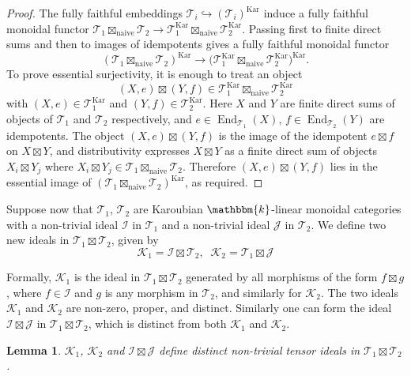 \documentclass[11pt,a4paper]{amsart}
\theoremstyle{plain}%
\newtheorem{lemma}{Lemma}[subsection]
\theoremstyle{definition}
\theoremstyle{remark}
\newcommand{\End}{\operatorname{End}}
\newcommand{\kk}{\mathbbm{k}}
\newcommand{\Kar}{\mathrm{Kar}}
\begin{document}
\begin{proof}
The fully faithful embeddings $\mathcal{T}_i\hookrightarrow (\mathcal{T}_i)^{\Kar}$ induce a fully faithful monoidal functor $\mathcal{T}_1\boxtimes_{\mathrm{naive}}\mathcal{T}_2 \to \mathcal{T}_1^{\Kar}\boxtimes_{\mathrm{naive}} \mathcal{T}_2^{\Kar}$. Passing first to finite direct sums and then to images of idempotents gives a fully faithful monoidal functor
\[ (\mathcal{T}_1\boxtimes_{\mathrm{naive}}\mathcal{T}_2)^{\Kar} \longrightarrow
\bigl(\mathcal{T}_1^{\Kar}\boxtimes_{\mathrm{naive}}\mathcal{T}_2^{\Kar}\bigr)^{\Kar}.
\] To prove essential surjectivity, it is enough to treat an object $$(X,e)\boxtimes(Y,f) \in \mathcal{T}_1^{\Kar}\boxtimes_{\mathrm{naive}}\mathcal{T}_2^{\Kar}$$ with $(X,e)\in \mathcal{T}_1^{\Kar}$ and $(Y,f)\in\mathcal{T}_2^{\Kar}.$ Here $X$ and $Y$ are finite direct sums of objects of $\mathcal{T}_1$ and $\mathcal{T}_2$ respectively, and $e\in \End_{\mathcal{T}_1}(X)$, $f\in \End_{\mathcal{T}_2}(Y)$ are idempotents. The object $(X,e)\boxtimes(Y,f)$ is the image of the idempotent $e\boxtimes f$ on $X\boxtimes Y$, and distributivity expresses $X\boxtimes Y$ as a finite direct sum of objects $X_i\boxtimes Y_j$ where $X_i\boxtimes Y_j\in \mathcal{T}_1\boxtimes_{\mathrm{naive}}\mathcal{T}_2$. Therefore $(X,e)\boxtimes(Y,f)$ lies in the essential image of $(\mathcal{T}_1\boxtimes_{\mathrm{naive}}\mathcal{T}_2)^{\Kar}$, as required.
\end{proof}

Suppose now that $\mathcal{T}_1$, $\mathcal{T}_2$ are Karoubian $\kk$-linear monoidal categories with a non-trivial ideal $\mathcal{I}$ in $\mathcal{T}_1$ and a non-trivial ideal $\mathcal{J}$ in $\mathcal{T}_2$. We define two new ideals in $\mathcal{T}_1\boxtimes\mathcal{T}_2$, given by
\[\mathcal{K}_1  = \mathcal{I} \boxtimes \mathcal{T}_2, \;\; \mathcal{K}_2  = \mathcal{T}_1 \boxtimes \mathcal{J}
\]

Formally, $\mathcal{K}_1$ is the ideal in $\mathcal{T}_1\boxtimes\mathcal{T}_2$ generated by all morphisms of the form $f \boxtimes g$, where $f \in \mathcal{I}$ and $g$ is any morphism in $\mathcal{T}_2$, and similarly for $\mathcal{K}_2$. The two ideals $\mathcal{K}_1$ and $\mathcal{K}_2$ are non-zero, proper, and distinct. Similarly one can form the ideal $\mathcal{I}\boxtimes \mathcal{J}$ in $\mathcal{T}_1\boxtimes\mathcal{T}_2$, which is distinct from both $\mathcal{K}_1$ and $\mathcal{K}_2$.

\begin{lemma} $\mathcal{K}_1$, $\mathcal{K}_2$ and $\mathcal{I}\boxtimes \mathcal{J}$ define distinct non-trivial tensor ideals in $\mathcal{T}_1 \boxtimes \mathcal{T}_2$.
\end{lemma}
\end{document}
